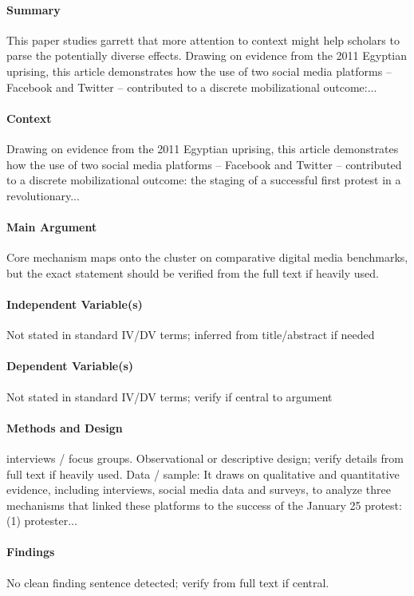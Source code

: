 \documentclass[12pt]{article}
\begin{document}
\paragraph{Summary} This paper studies garrett that more attention to context might help scholars to parse the potentially diverse effects. Drawing on evidence from the 2011 Egyptian uprising, this article demonstrates how the use of two social media platforms -- Facebook and Twitter -- contributed to a discrete mobilizational outcome:...

\paragraph{Context} Drawing on evidence from the 2011 Egyptian uprising, this article demonstrates how the use of two social media platforms -- Facebook and Twitter -- contributed to a discrete mobilizational outcome: the staging of a successful first protest in a revolutionary...

\paragraph{Main Argument} Core mechanism maps onto the cluster on comparative digital media benchmarks, but the exact statement should be verified from the full text if heavily used.

\paragraph{Independent Variable(s)} Not stated in standard IV/DV terms; inferred from title/abstract if needed

\paragraph{Dependent Variable(s)} Not stated in standard IV/DV terms; verify if central to argument

\paragraph{Methods and Design} interviews / focus groups. Observational or descriptive design; verify details from full text if heavily used. Data / sample: It draws on qualitative and quantitative evidence, including interviews, social media data and surveys, to analyze three mechanisms that linked these platforms to the success of the January 25 protest: (1) protester...

\paragraph{Findings} No clean finding sentence detected; verify from full text if central.
\end{document}
